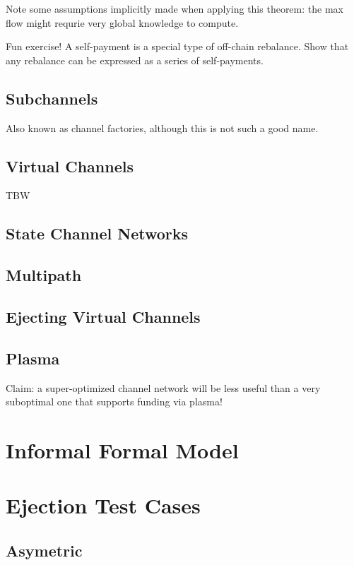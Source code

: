 \documentclass{article}
\begin{document}
Note some assumptions implicitly made when applying this theorem: the max flow might requrie very global knowledge to compute.

Fun exercise! A self-payment is a special type of off-chain rebalance. Show that any rebalance can be expressed as a series of self-payments.

\subsection*{Subchannels}

Also known as channel factories, although this is not such a good name.

\subsection*{Virtual Channels}

TBW

\subsection*{State Channel Networks}

\subsection*{Multipath}

\subsection*{Ejecting Virtual Channels}

\subsection*{Plasma}

Claim: a super-optimized channel network will be less useful than a very suboptimal one that supports funding via plasma!

\section*{Informal Formal Model}

\section*{Ejection Test Cases}

\subsection*{Asymetric}
\end{document}

